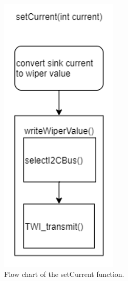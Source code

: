 \FloatBarrier
\begin{figure}[ht!]
    \centering
    \includegraphics[scale=0.7]{software_setCurrent_flow_chart.png}
    \caption{Flow chart of the setCurrent function.}
    \label{fig:setcurrent}
\end{figure}
\FloatBarrier
